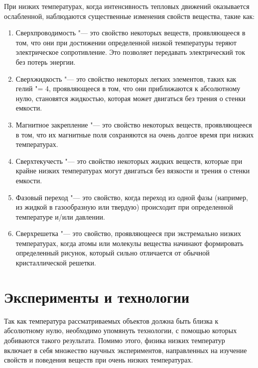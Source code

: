 \documentclass[bachelor,och,referat]{SCWorks_corrected}
\begin{document}
При низких температурах, когда интенсивность тепловых движений оказывается ослабленной, наблюдаются существенные изменения свойств вещества, такие как:\begin{enumerate}
    \item Сверхпроводимость "--- это свойство некоторых веществ, проявляющееся в том, что они при достижении определенной низкой температуры теряют электрическое сопротивление. Это позволяет передавать электрический ток без потерь энергии.

    \item Сверхжидкость "--- это свойство некоторых легких элементов, таких как гелий "= 4, проявляющееся в том, что они приближаются к абсолютному нулю, становятся жидкостью, которая может двигаться без трения о стенки емкости.

    \item Магнитное закрепление "--- это свойство некоторых веществ, проявляющееся в том, что их магнитные поля сохраняются на очень долгое время при низких температурах.

    \item Сверхтекучесть "--- это свойство некоторых жидких веществ, которые при крайне низких температурах могут двигаться без вязкости и трения о стенки емкости.

    \item Фазовый переход "--- это свойство, когда переход из одной фазы (например, из жидкой в газообразную или твердую) происходит при определенной температуре и/или давлении.

    \item Сверхрешетка "--- это свойство, проявляющееся при экстремально низких температурах, когда атомы или молекулы вещества начинают формировать определенный рисунок, который сильно отличается от обычной кристаллической решетки.

\end{enumerate}

\section{Эксперименты и технологии}
Так как температура рассматриваемых объектов должна быть близка к абсолютному нулю, необходимо упомянуть технологии, с помощью которых добиваются такого результата. Помимо этого, физика низких температур включает в себя множество научных экспериментов, направленных на изучение свойств и поведения веществ при очень низких температурах.
\end{document}
